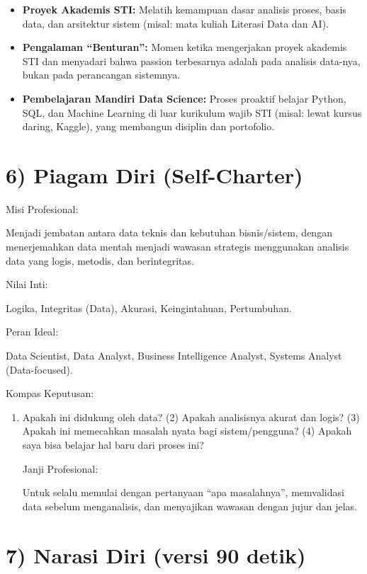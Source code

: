 \documentclass[
  letterpaper,
  DIV=11,
  numbers=noendperiod]{scrreprt}
\providecommand{\tightlist}{%
  \setlength{\itemsep}{0pt}\setlength{\parskip}{0pt}}
\begin{document}
\begin{itemize}
\tightlist
\item
  \textbf{Proyek Akademis STI:} Melatih kemampuan dasar analisis proses,
  basis data, dan arsitektur sistem (misal: mata kuliah Literasi Data
  dan AI).
\item
  \textbf{Pengalaman ``Benturan'':} Momen ketika mengerjakan proyek
  akademis STI dan menyadari bahwa passion terbesarnya adalah pada
  analisis data-nya, bukan pada perancangan sistemnya.
\item
  \textbf{Pembelajaran Mandiri Data Science:} Proses proaktif belajar
  Python, SQL, dan Machine Learning di luar kurikulum wajib STI (misal:
  lewat kursus daring, Kaggle), yang membangun disiplin dan portofolio.
\end{itemize}

\section{6) Piagam Diri (Self-Charter)}\label{piagam-diri-self-charter}

Misi Profesional:

Menjadi jembatan antara data teknis dan kebutuhan bisnis/sistem, dengan
menerjemahkan data mentah menjadi wawasan strategis menggunakan analisis
data yang logis, metodis, dan berintegritas.

Nilai Inti:

Logika, Integritas (Data), Akurasi, Keingintahuan, Pertumbuhan.

Peran Ideal:

Data Scientist, Data Analyst, Business Intelligence Analyst, Systems
Analyst (Data-focused).

Kompas Keputusan:

\begin{enumerate}
\def\labelenumi{(\arabic{enumi})}
\tightlist
\item
  Apakah ini didukung oleh data? (2) Apakah analisisnya akurat dan
  logis? (3) Apakah ini memecahkan masalah nyata bagi sistem/pengguna?
  (4) Apakah saya bisa belajar hal baru dari proses ini?

  Janji Profesional:

  Untuk selalu memulai dengan pertanyaan ``apa masalahnya'', memvalidasi
  data sebelum menganalisis, dan menyajikan wawasan dengan jujur dan
  jelas.
\end{enumerate}

\section{7) Narasi Diri (versi 90
detik)}\label{narasi-diri-versi-90-detik}
\end{document}
